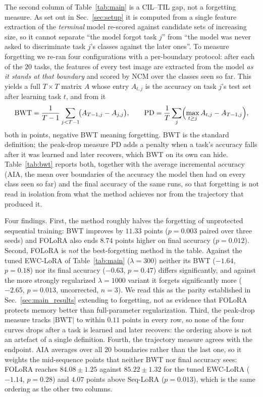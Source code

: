 The second column of Table~\ref{tab:main} is a CIL--TIL gap, not a forgetting measure. As set out
in Sec.~\ref{sec:setup} it is computed from a single feature extraction of the \emph{terminal}
model re-scored against candidate sets of increasing size, so it cannot separate ``the model
forgot task $j$'' from ``the model was never asked to discriminate task $j$'s classes against the
later ones''. To measure forgetting we re-ran four configurations with a per-boundary protocol:
after each of the $20$ tasks, the features of every test image are extracted from the model
\emph{as it stands at that boundary} and scored by NCM over the classes seen so far. This yields
a full $T\times T$ matrix $A$ whose entry $A_{t,j}$ is the accuracy on task $j$'s test set after
learning task $t$, and from it
\begin{equation}
\mathrm{BWT} = \frac{1}{T-1}\sum_{j<T-1}\!\bigl(A_{T-1,j}-A_{j,j}\bigr),
\qquad
\mathrm{PD} = \frac{1}{T}\sum_{j}\Bigl(\max_{t\ge j}A_{t,j}-A_{T-1,j}\Bigr),
\end{equation}
both in points, negative BWT meaning forgetting. BWT is the standard definition; the peak-drop
measure PD adds a penalty when a task's accuracy falls after it was learned and later recovers,
which BWT on its own can hide. Table~\ref{tab:bwt} reports both, together with the average
incremental accuracy (AIA, the mean over boundaries of the accuracy the model then had on every
class seen so far) and the final accuracy of the same runs, so that forgetting is not read in
isolation from what the method achieves nor from the trajectory that produced it.



Four findings. First, the method roughly halves the forgetting of unprotected sequential
training: BWT improves by $11.33$ points ($p=0.003$ paired over three seeds) and FOLoRA also
ends $8.74$ points higher on final accuracy ($p=0.012$). Second, FOLoRA is \emph{not} the
best-forgetting method in the table. Against the tuned EWC-LoRA of Table~\ref{tab:main}
($\lambda{=}300$) neither its BWT ($-1.64$, $p=0.18$) nor its final accuracy ($-0.63$,
$p=0.47$) differs significantly, and against the more strongly regularized $\lambda{=}1000$
variant it forgets significantly more ($-2.65$, $p=0.013$, uncorrected, $n=3$). We read this as
the parity established in Sec.~\ref{sec:main_results} extending to forgetting, not as evidence
that FOLoRA protects memory better than full-parameter regularization. Third, the peak-drop
measure tracks $|\mathrm{BWT}|$ to within $0.11$ points in every row, so none of the four curves
drops after a task is learned and later recovers: the ordering above is not an artefact of a
single definition. Fourth, the trajectory measure agrees with the endpoint. AIA averages over
all $20$ boundaries rather than the last one, so it weights the mid-sequence points that
neither BWT nor final accuracy sees: FOLoRA reaches $84.08\pm1.25$ against $85.22\pm1.32$ for
the tuned EWC-LoRA ($-1.14$, $p=0.28$) and $4.07$ points above Seq-LoRA ($p=0.013$), which is
the same ordering as the other two columns.

